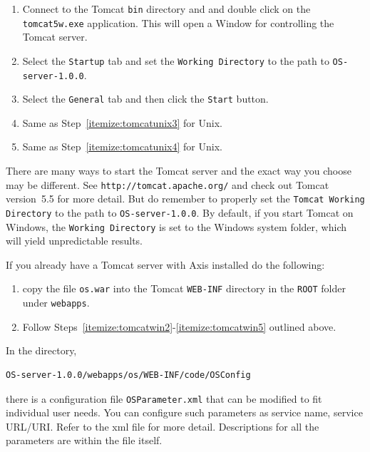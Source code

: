 \documentclass[11pt]{article}
\renewcommand{\_}{{\char"5F}}
\renewcommand{\{}{{\char"7B}}
\renewcommand{\}}{{\char"7D}}
\renewcommand{\^}{{\char"0D}}
\renewcommand{\'}{{\char"0D}}
\newcommand{\UrlTomcat}{http://tomcat.apache.org/}
\begin{document}
\begin{enumerate}[Step 1:]
\begin{enumerate}[Step 1.]
\item{}  \label{itemize:tomcatwin3}  Connect to the Tomcat {\tt bin} directory and and double click on the
{\tt tomcat5w.exe} application.  This will open a Window for controlling the Tomcat server.

\item{}  \label{itemize:tomcatwin4} Select the {\tt Startup} tab and set the {\tt Working Directory}
to the path to {\tt OS-server-1.0.0}.

\item{}  \label{itemize:tomcatwin5} Select the {\tt General} tab and then click the {\tt Start} button.

\item{}  Same as Step~\ref{itemize:tomcatunix3} for Unix.

\item{}  Same as Step~\ref{itemize:tomcatunix4} for Unix.

\end{enumerate}

\vskip 8pt

There are many ways to start the Tomcat server and the exact way you choose may be different.
See {\tt\UrlTomcat} and check out Tomcat version~5.5 for more detail. But do remember to
properly set the {\tt Tomcat Working Directory} to the path to {\tt OS-server-1.0.0}. By default,
if you start Tomcat on Windows, the {\tt Working Directory} is set to the Windows system folder,
which will yield unpredictable results.

\vskip 8pt

If you already have a Tomcat server with Axis installed do the following:
\begin{enumerate}
\item{} copy the file {\tt os.war} into the Tomcat {\tt WEB-INF} directory in the {\tt ROOT} folder under {\tt webapps}.

\item{}  Follow Steps~\ref{itemize:tomcatwin2}-\ref{itemize:tomcatwin5} outlined above.
\end{enumerate}

In the directory,
\begin{verbatim}
OS-server-1.0.0/webapps/os/WEB-INF/code/OSConfig
\end{verbatim}
there is a configuration file {\tt OSParameter.xml} that can be modified to fit individual user needs. You can configure such parameters as service name, service URL/URI. Refer to the xml file for more detail. Descriptions for all the parameters are within the file itself.


\end{enumerate}
\end{document}
